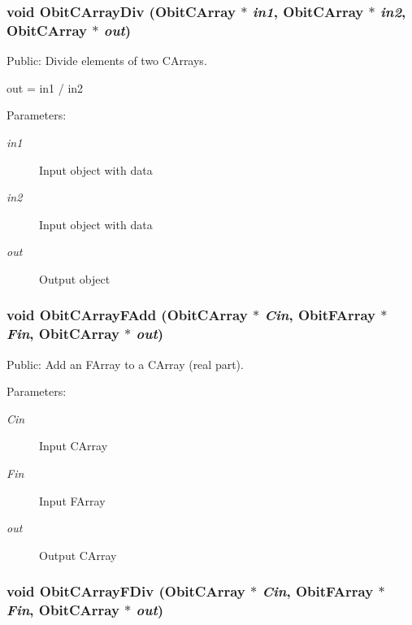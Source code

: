 \subsubsection{\setlength{\rightskip}{0pt plus 5cm}void Obit\-CArray\-Div ({\bf Obit\-CArray} $\ast$ {\em in1}, {\bf Obit\-CArray} $\ast$ {\em in2}, {\bf Obit\-CArray} $\ast$ {\em out})}\label{ObitCArray_8c_a25}


Public: Divide elements of two CArrays. 

out = in1 / in2 \begin{Desc}
\item[Parameters:]
\begin{description}
\item[{\em in1}]Input object with data \item[{\em in2}]Input object with data \item[{\em out}]Output object \end{description}
\end{Desc}
\subsubsection{\setlength{\rightskip}{0pt plus 5cm}void Obit\-CArray\-FAdd ({\bf Obit\-CArray} $\ast$ {\em Cin}, {\bf Obit\-FArray} $\ast$ {\em Fin}, {\bf Obit\-CArray} $\ast$ {\em out})}\label{ObitCArray_8c_a31}


Public: Add an FArray to a CArray (real part). 

\begin{Desc}
\item[Parameters:]
\begin{description}
\item[{\em Cin}]Input CArray \item[{\em Fin}]Input FArray \item[{\em out}]Output CArray \end{description}
\end{Desc}
\subsubsection{\setlength{\rightskip}{0pt plus 5cm}void Obit\-CArray\-FDiv ({\bf Obit\-CArray} $\ast$ {\em Cin}, {\bf Obit\-FArray} $\ast$ {\em Fin}, {\bf Obit\-CArray} $\ast$ {\em out})}\label{ObitCArray_8c_a30}


